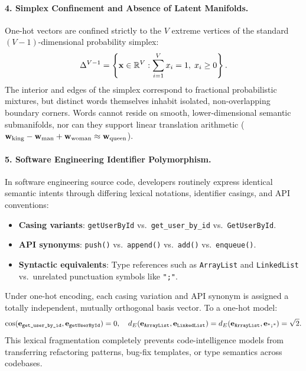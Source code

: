 \documentclass[../../main.tex]{subfiles}
\begin{document}
\paragraph{4. Simplex Confinement and Absence of Latent Manifolds.}
One-hot vectors are confined strictly to the $V$ extreme vertices of the standard $(V-1)$-dimensional probability simplex:
\begin{equation}
\label{eq:standard_simplex}
\Delta^{V-1} = \left\{ \mathbf{x} \in \mathbb{R}^V : \sum_{i=1}^V x_i = 1, \; x_i \ge 0 \right\}.
\end{equation}
The interior and edges of the simplex correspond to fractional probabilistic mixtures, but distinct words themselves inhabit isolated, non-overlapping boundary corners. Words cannot reside on smooth, lower-dimensional semantic submanifolds, nor can they support linear translation arithmetic ($\mathbf{w}_{\text{king}} - \mathbf{w}_{\text{man}} + \mathbf{w}_{\text{woman}} \approx \mathbf{w}_{\text{queen}}$).

\paragraph{5. Software Engineering Identifier Polymorphism.}
In software engineering source code, developers routinely express identical semantic intents through differing lexical notations, identifier casings, and API conventions:
\begin{itemize}
    \item \textbf{Casing variants}: \texttt{getUserById} vs.~\texttt{get\_user\_by\_id} vs.~\texttt{GetUserById}.
    \item \textbf{API synonyms}: \texttt{push()} vs.~\texttt{append()} vs.~\texttt{add()} vs.~\texttt{enqueue()}.
    \item \textbf{Syntactic equivalents}: Type references such as \texttt{ArrayList} and \texttt{LinkedList} vs.~unrelated punctuation symbols like \texttt{";"}.
\end{itemize}
Under one-hot encoding, each casing variation and API synonym is assigned a totally independent, mutually orthogonal basis vector. To a one-hot model:
\begin{equation}
\label{eq:code_syntax_equidistance}
\cos(\mathbf{e}_{\text{\texttt{get\_user\_by\_id}}}, \mathbf{e}_{\text{\texttt{getUserById}}}) = 0, \quad d_E(\mathbf{e}_{\text{\texttt{ArrayList}}}, \mathbf{e}_{\text{\texttt{LinkedList}}}) = d_E(\mathbf{e}_{\text{\texttt{ArrayList}}}, \mathbf{e}_{\text{\texttt{";"}}}) = \sqrt{2}.
\end{equation}
This lexical fragmentation completely prevents code-intelligence models from transferring refactoring patterns, bug-fix templates, or type semantics across codebases.
\end{document}
